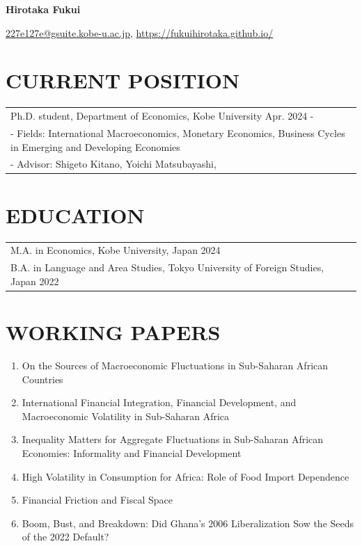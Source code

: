 \documentclass[11pt]{article}
\makeatletter
\newcommand{\websiteurl}{{https://fukuihirotaka.github.io/}}
\newcommand{\websitename}{https://fukuihirotaka.github.io/}
\newcommand{\email}{227e127e@gsuite.kobe-u.ac.jp}
\makeatother
\begin{document}
\begin{center}
\textbf{\LARGE Hirotaka Fukui}

\vspace{0.3em}
{\color{darkred} \href{mailto:\email}{\email}, \href{\websiteurl}{\websitename}}
\end{center}

\section*{CURRENT POSITION}
\begin{tabularx}{\linewidth}{X}
Ph.D. student, Department of Economics, Kobe University \hfill Apr. 2024 - \\
- Fields: International Macroeconomics, Monetary Economics, Business Cycles in Emerging and Developing Economies\\
- Advisor: Shigeto Kitano, Yoichi Matsubayashi,
\end{tabularx}

\section*{EDUCATION}
\begin{tabularx}{\linewidth}{X}
M.A. in Economics, Kobe University, Japan \hfill 2024\\
B.A. in Language and Area Studies, Tokyo University of Foreign Studies, Japan \hfill 2022
\end{tabularx}

\section*{WORKING PAPERS}
\begin{enumerate}
\item On the Sources of Macroeconomic Fluctuations in Sub-Saharan African Countries
\item International Financial Integration, Financial Development,
and Macroeconomic Volatility in Sub-Saharan Africa
\item Inequality Matters for Aggregate Fluctuations in Sub-Saharan African Economies: Informality and Financial Development
\item High Volatility in Consumption for Africa: Role of Food Import Dependence
\item Financial Friction and Fiscal Space
\item Boom, Bust, and Breakdown: Did Ghana’s 2006 Liberalization Sow the Seeds of the 2022 Default?
\end{enumerate}
\end{document}

